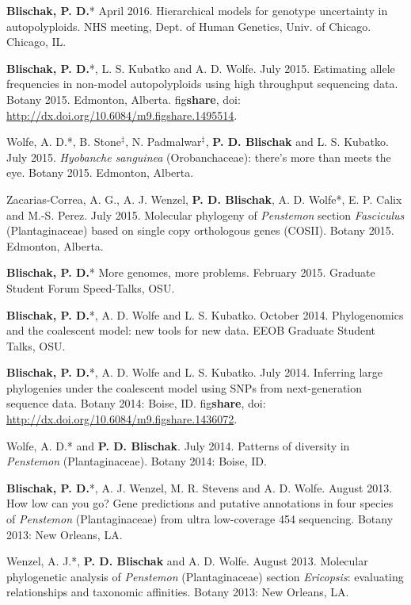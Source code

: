 \documentclass[]{article}
\begin{document}
\begin{etaremune}
\item
  \textbf{Blischak, P. D.}* April 2016. Hierarchical models for genotype
  uncertainty in autopolyploids. NHS meeting, Dept. of Human Genetics, Univ. 
  of Chicago. Chicago, IL.
\item
  \textbf{Blischak, P. D.}*, L. S. Kubatko and A. D. Wolfe. July 2015.
  Estimating allele frequencies in non-model autopolyploids using high
  throughput sequencing data. Botany 2015. Edmonton, Alberta.
  fig\textbf{share}, doi:
  \href{http://dx.doi.org/10.6084/m9.figshare.1495514}{\url{http://dx.doi.org/10.6084/m9.figshare.1495514}}.
\item
  Wolfe, A. D.*, B. Stone\(^{\ddagger}\), N. Padmalwar\(^{\ddagger}\),
  \textbf{P. D. Blischak} and L. S. Kubatko. July 2015. \emph{Hyobanche
  sanguinea} (Orobanchaceae): there's more than meets the eye. Botany
  2015. Edmonton, Alberta.
\item
  Zacarias-Correa, A. G., A. J. Wenzel, \textbf{P. D. Blischak}, A. D.
  Wolfe*, E. P. Calix and M.-S. Perez. July 2015. Molecular phylogeny of
  \emph{Penstemon} section \emph{Fasciculus} (Plantaginaceae) based on
  single copy orthologous genes (COSII). Botany 2015. Edmonton, Alberta.
\item
  \textbf{Blischak, P. D.}* More genomes, more problems. February 2015.
  Graduate Student Forum Speed-Talks, OSU.
\item
  \textbf{Blischak, P. D.}*, A. D. Wolfe and L. S. Kubatko. October
  2014. Phylogenomics and the coalescent model: new tools for new data.
  EEOB Graduate Student Talks, OSU.
\item
  \textbf{Blischak, P. D.}*, A. D. Wolfe and L. S. Kubatko. July 2014.
  Inferring large phylogenies under the coalescent model using SNPs from
  next-generation sequence data. Botany 2014: Boise, ID.
  fig\textbf{share}, doi:
  \href{http://dx.doi.org/10.6084/m9.figshare.1436072}{\url{http://dx.doi.org/10.6084/m9.figshare.1436072}}.
\item
  Wolfe, A. D.* and \textbf{P. D. Blischak}. July 2014. Patterns of
  diversity in \emph{Penstemon} (Plantaginaceae). Botany 2014: Boise,
  ID.
\item
  \textbf{Blischak, P. D.}*, A. J. Wenzel, M. R. Stevens and A. D.
  Wolfe. August 2013. How low can you go? Gene predictions and putative
  annotations in four species of \emph{Penstemon} (Plantaginaceae) from
  ultra low-coverage 454 sequencing. Botany 2013: New Orleans, LA.
\item
  Wenzel, A. J.*, \textbf{P. D. Blischak} and A. D. Wolfe. August 2013.
  Molecular phylogenetic analysis of \emph{Penstemon} (Plantaginaceae)
  section \emph{Ericopsis}: evaluating relationships and taxonomic
  affinities. Botany 2013: New Orleans, LA.
\end{etaremune}
\end{document}
